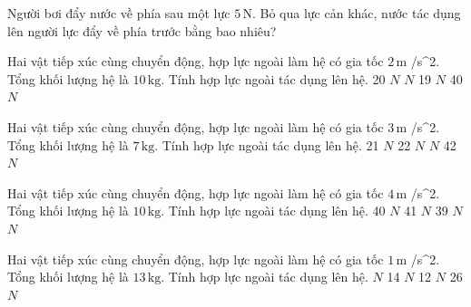 \begin{bt}
Người bơi đẩy nước về phía sau một lực $5\,\text{N}$. Bỏ qua lực cản khác, nước tác dụng lên người lực đẩy về phía trước bằng bao nhiêu?
\end{bt}

\begin{ex}
Hai vật tiếp xúc cùng chuyển động, hợp lực ngoài làm hệ có gia tốc $2\,\text{m}$ /s^2. Tổng khối lượng hệ là $10\,\text{kg}$. Tính hợp lực ngoài tác dụng lên hệ.
\choice
{20 $N$}
{ $N$}
{19 $N$}
{40 $N$}
\end{ex}

\begin{ex}
Hai vật tiếp xúc cùng chuyển động, hợp lực ngoài làm hệ có gia tốc $3\,\text{m}$ /s^2. Tổng khối lượng hệ là $7\,\text{kg}$. Tính hợp lực ngoài tác dụng lên hệ.
\choice
{21 $N$}
{22 $N$}
{ $N$}
{42 $N$}
\end{ex}

\begin{ex}
Hai vật tiếp xúc cùng chuyển động, hợp lực ngoài làm hệ có gia tốc $4\,\text{m}$ /s^2. Tổng khối lượng hệ là $10\,\text{kg}$. Tính hợp lực ngoài tác dụng lên hệ.
\choice
{40 $N$}
{41 $N$}
{39 $N$}
{ $N$}
\end{ex}

\begin{ex}
Hai vật tiếp xúc cùng chuyển động, hợp lực ngoài làm hệ có gia tốc $1\,\text{m}$ /s^2. Tổng khối lượng hệ là $13\,\text{kg}$. Tính hợp lực ngoài tác dụng lên hệ.
\choice
{ $N$}
{14 $N$}
{12 $N$}
{26 $N$}
\end{ex}

